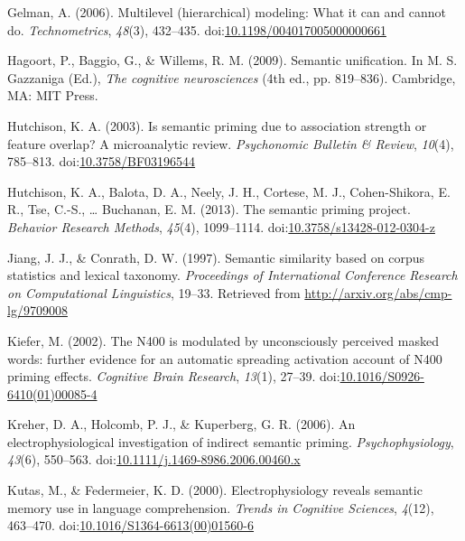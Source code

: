 \documentclass[english,man]{apa6}
\theoremstyle{definition}
\theoremstyle{definition}
\theoremstyle{definition}
\theoremstyle{remark}
\begin{document}
\hypertarget{ref-Gelman2006}{}
Gelman, A. (2006). Multilevel (hierarchical) modeling: What it can and
cannot do. \emph{Technometrics}, \emph{48}(3), 432--435.
doi:\href{https://doi.org/10.1198/004017005000000661}{10.1198/004017005000000661}

\hypertarget{ref-Hagoort2009}{}
Hagoort, P., Baggio, G., \& Willems, R. M. (2009). Semantic unification.
In M. S. Gazzaniga (Ed.), \emph{The cognitive neurosciences} (4th ed.,
pp. 819--836). Cambridge, MA: MIT Press.

\hypertarget{ref-Hutchison2003}{}
Hutchison, K. A. (2003). Is semantic priming due to association strength
or feature overlap? A microanalytic review. \emph{Psychonomic Bulletin
\& Review}, \emph{10}(4), 785--813.
doi:\href{https://doi.org/10.3758/BF03196544}{10.3758/BF03196544}

\hypertarget{ref-Hutchison2013}{}
Hutchison, K. A., Balota, D. A., Neely, J. H., Cortese, M. J.,
Cohen-Shikora, E. R., Tse, C.-S., \ldots{} Buchanan, E. M. (2013). The
semantic priming project. \emph{Behavior Research Methods},
\emph{45}(4), 1099--1114.
doi:\href{https://doi.org/10.3758/s13428-012-0304-z}{10.3758/s13428-012-0304-z}

\hypertarget{ref-Jiang1997}{}
Jiang, J. J., \& Conrath, D. W. (1997). Semantic similarity based on
corpus statistics and lexical taxonomy. \emph{Proceedings of
International Conference Research on Computational Linguistics}, 19--33.
Retrieved from \url{http://arxiv.org/abs/cmp-lg/9709008}

\hypertarget{ref-Kiefer2002}{}
Kiefer, M. (2002). The N400 is modulated by unconsciously perceived
masked words: further evidence for an automatic spreading activation
account of N400 priming effects. \emph{Cognitive Brain Research},
\emph{13}(1), 27--39.
doi:\href{https://doi.org/10.1016/S0926-6410(01)00085-4}{10.1016/S0926-6410(01)00085-4}

\hypertarget{ref-Kreher2006}{}
Kreher, D. A., Holcomb, P. J., \& Kuperberg, G. R. (2006). An
electrophysiological investigation of indirect semantic priming.
\emph{Psychophysiology}, \emph{43}(6), 550--563.
doi:\href{https://doi.org/10.1111/j.1469-8986.2006.00460.x}{10.1111/j.1469-8986.2006.00460.x}

\hypertarget{ref-Kutas2000}{}
Kutas, M., \& Federmeier, K. D. (2000). Electrophysiology reveals
semantic memory use in language comprehension. \emph{Trends in Cognitive
Sciences}, \emph{4}(12), 463--470.
doi:\href{https://doi.org/10.1016/S1364-6613(00)01560-6}{10.1016/S1364-6613(00)01560-6}
\end{document}
